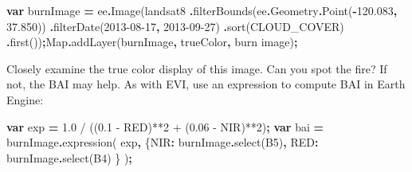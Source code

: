 \documentclass[
]{article}
\newenvironment{Shaded}{\begin{snugshade}}{\end{snugshade}}
\newcommand{\AttributeTok}[1]{\textcolor[rgb]{0.77,0.63,0.00}{#1}}
\newcommand{\BuiltInTok}[1]{#1}
\newcommand{\FloatTok}[1]{\textcolor[rgb]{0.00,0.00,0.81}{#1}}
\newcommand{\FunctionTok}[1]{\textcolor[rgb]{0.00,0.00,0.00}{#1}}
\newcommand{\KeywordTok}[1]{\textcolor[rgb]{0.13,0.29,0.53}{\textbf{#1}}}
\newcommand{\NormalTok}[1]{#1}
\newcommand{\OperatorTok}[1]{\textcolor[rgb]{0.81,0.36,0.00}{\textbf{#1}}}
\newcommand{\StringTok}[1]{\textcolor[rgb]{0.31,0.60,0.02}{#1}}
\begin{document}
\begin{Shaded}
\begin{Highlighting}[]
\KeywordTok{var}\NormalTok{ burnImage }\OperatorTok{=}\NormalTok{ ee}\OperatorTok{.}\FunctionTok{Image}\NormalTok{(landsat8                         }
                         \OperatorTok{.}\FunctionTok{filterBounds}\NormalTok{(ee}\OperatorTok{.}\AttributeTok{Geometry}\OperatorTok{.}\FunctionTok{Point}\NormalTok{(}\OperatorTok{{-}}\FloatTok{120.083}\OperatorTok{,} \FloatTok{37.850}\NormalTok{))                                        }
                         \OperatorTok{.}\FunctionTok{filterDate}\NormalTok{(}\StringTok{\textquotesingle{}2013{-}08{-}17\textquotesingle{}}\OperatorTok{,} \StringTok{\textquotesingle{}2013{-}09{-}27\textquotesingle{}}\NormalTok{)                         }
                         \OperatorTok{.}\FunctionTok{sort}\NormalTok{(}\StringTok{\textquotesingle{}CLOUD\_COVER\textquotesingle{}}\NormalTok{)                         }
                         \OperatorTok{.}\FunctionTok{first}\NormalTok{())}\OperatorTok{;}\BuiltInTok{Map}\OperatorTok{.}\FunctionTok{addLayer}\NormalTok{(burnImage}\OperatorTok{,}\NormalTok{ trueColor}\OperatorTok{,} \StringTok{\textquotesingle{}burn image\textquotesingle{}}\NormalTok{)}\OperatorTok{;}  
\end{Highlighting}
\end{Shaded}

Closely examine the true color display of this image. Can you spot the fire? If not, the BAI may help. As with EVI, use an expression to compute BAI in Earth Engine:

\begin{Shaded}
\begin{Highlighting}[]
\KeywordTok{var}\NormalTok{ exp }\OperatorTok{=} \StringTok{\textquotesingle{}1.0  / ((0.1 {-} RED)**2 + (0.06 {-} NIR)**2)\textquotesingle{}}\OperatorTok{;}
\KeywordTok{var}\NormalTok{ bai }\OperatorTok{=}\NormalTok{ burnImage}\OperatorTok{.}\FunctionTok{expression}\NormalTok{(  exp}\OperatorTok{,}   
\NormalTok{                               \{}\StringTok{\textquotesingle{}NIR\textquotesingle{}}\OperatorTok{:}\NormalTok{ burnImage}\OperatorTok{.}\FunctionTok{select}\NormalTok{(}\StringTok{\textquotesingle{}B5\textquotesingle{}}\NormalTok{)}\OperatorTok{,}   
                                \StringTok{\textquotesingle{}RED\textquotesingle{}}\OperatorTok{:}\NormalTok{ burnImage}\OperatorTok{.}\FunctionTok{select}\NormalTok{(}\StringTok{\textquotesingle{}B4\textquotesingle{}}\NormalTok{) }
\NormalTok{                               \}}
\NormalTok{                              )}\OperatorTok{;}  
\end{Highlighting}
\end{Shaded}
\end{document}
